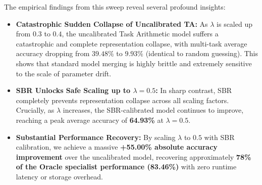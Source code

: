\documentclass{article}
\theoremstyle{plain}
\theoremstyle{definition}
\theoremstyle{remark}
\begin{document}
The empirical findings from this sweep reveal several profound insights:
\begin{itemize}
    \item \textbf{Catastrophic Sudden Collapse of Uncalibrated TA:} As $\lambda$ is scaled up from $0.3$ to $0.4$, the uncalibrated Task Arithmetic model suffers a catastrophic and complete representation collapse, with multi-task average accuracy dropping from $39.48\%$ to $9.93\%$ (identical to random guessing). This shows that standard model merging is highly brittle and extremely sensitive to the scale of parameter drift.
    \item \textbf{SBR Unlocks Safe Scaling up to $\lambda = 0.5$:} In sharp contrast, SBR completely prevents representation collapse across all scaling factors. Crucially, as $\lambda$ increases, the SBR-calibrated model continues to improve, reaching a peak average accuracy of \textbf{64.93\%} at $\lambda = 0.5$.
    \item \textbf{Substantial Performance Recovery:} By scaling $\lambda$ to $0.5$ with SBR calibration, we achieve a massive \textbf{+55.00\% absolute accuracy improvement} over the uncalibrated model, recovering approximately \textbf{78\% of the Oracle specialist performance (83.46\%)} with zero runtime latency or storage overhead.
\end{itemize}
\end{document}
